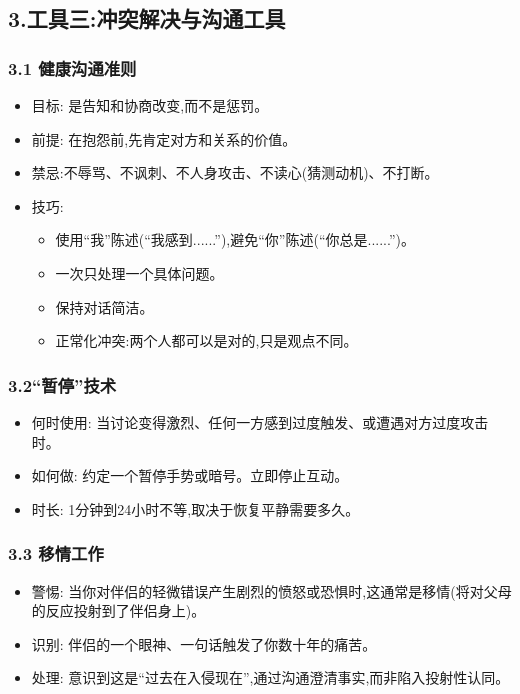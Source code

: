 \documentclass[11pt, a4paper]{article}
\begin{document}
\vspace{0.3cm}

\subsection*{3.工具三:冲突解决与沟通工具}

\subsubsection*{3.1 健康沟通准则}
\begin{itemize}
    \item 目标: 是告知和协商改变,而不是惩罚。
    \item 前提: 在抱怨前,先肯定对方和关系的价值。
    \item 禁忌:不辱骂、不讽刺、不人身攻击、不读心(猜测动机)、不打断。
    \item 技巧:
    \begin{itemize}
    \item 使用“我”陈述(“我感到......”),避免“你”陈述(“你总是......”)。
    \item 一次只处理一个具体问题。
    \item 保持对话简洁。
    \item 正常化冲突:两个人都可以是对的,只是观点不同。
    \end{itemize}
\end{itemize}

\subsubsection*{3.2“暂停”技术}
\begin{itemize}
    \item 何时使用: 当讨论变得激烈、任何一方感到过度触发、或遭遇对方过度攻击时。
    \item 如何做: 约定一个暂停手势或暗号。立即停止互动。
    \item 时长: 1分钟到24小时不等,取决于恢复平静需要多久。
\end{itemize}

\subsubsection*{3.3 移情工作}
\begin{itemize}
    \item 警惕: 当你对伴侣的轻微错误产生剧烈的愤怒或恐惧时,这通常是移情(将对父母的反应投射到了伴侣身上)。
    \item 识别: 伴侣的一个眼神、一句话触发了你数十年的痛苦。
    \item 处理: 意识到这是“过去在入侵现在”,通过沟通澄清事实,而非陷入投射性认同。
\end{itemize}
\end{document}
